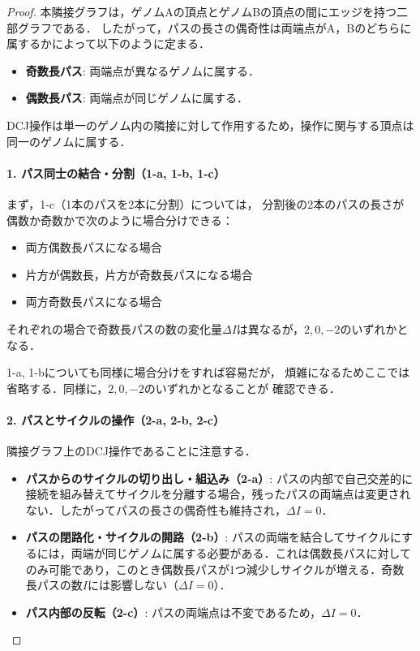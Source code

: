 \documentclass[paper=a4,fontsize=11pt,report,oneside]{jlreq}
\begin{document}
\begin{proof}
本隣接グラフは，ゲノムAの頂点とゲノムBの頂点の間にエッジを持つ二部グラフである．
したがって，パスの長さの偶奇性は両端点がA，Bのどちらに属するかによって以下のように定まる．
\begin{itemize}
    \item \textbf{奇数長パス}: 両端点が異なるゲノムに属する．
    \item \textbf{偶数長パス}: 両端点が同じゲノムに属する．
\end{itemize}
DCJ操作は単一のゲノム内の隣接に対して作用するため，操作に関与する頂点は同一のゲノムに属する．

\paragraph{1. パス同士の結合・分割（1-a, 1-b, 1-c）}

まず，1-c（1本のパスを2本に分割）については，
分割後の2本のパスの長さが偶数か奇数かで次のように場合分けできる：
\begin{itemize}
  \item 両方偶数長パスになる場合
  \item 片方が偶数長，片方が奇数長パスになる場合
  \item 両方奇数長パスになる場合
\end{itemize}
それぞれの場合で奇数長パスの数の変化量$\Delta I$は異なるが，$2, 0, -2$のいずれかとなる．

1-a, 1-bについても同様に場合分けをすれば容易だが，
煩雑になるためここでは省略する．同様に，$2, 0, -2$のいずれかとなることが
確認できる．

\paragraph{2. パスとサイクルの操作（2-a, 2-b, 2-c）}

隣接グラフ上のDCJ操作であることに注意する．

\begin{itemize}
    \item \textbf{パスからのサイクルの切り出し・組込み（2-a）}:
    パスの内部で自己交差的に接続を組み替えてサイクルを分離する場合，残ったパスの両端点は変更されない．したがってパスの長さの偶奇性も維持され，$\Delta I = 0$．
    \item \textbf{パスの閉路化・サイクルの開路（2-b）}:
    パスの両端を結合してサイクルにするには，両端が同じゲノムに属する必要がある．これは偶数長パスに対してのみ可能であり，このとき偶数長パスが1つ減少しサイクルが増える．奇数長パスの数$I$には影響しない（$\Delta I = 0$）．
    \item \textbf{パス内部の反転（2-c）}:
    パスの両端点は不変であるため，$\Delta I = 0$．
\end{itemize}


\end{proof}
\end{document}
